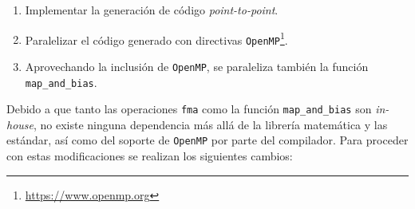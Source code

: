 \begin{enumerate}
    \item Implementar la generación de código \textit{point-to-point}.
    \item Paralelizar el código generado con directivas \texttt{OpenMP}\footnote{\url{https://www.openmp.org}}.
    \item Aprovechando la inclusión de \texttt{OpenMP}, se paraleliza también la función \texttt{map\_and\_bias}.
\end{enumerate}

Debido a que tanto las operaciones \texttt{\acrshort{fma}} como la función \texttt{map\_and\_bias} son \textit{in-house}, no existe ninguna dependencia más allá de la librería matemática y las estándar, así como del soporte de \texttt{OpenMP} por parte del compilador. Para proceder con estas modificaciones se realizan los siguientes cambios:
